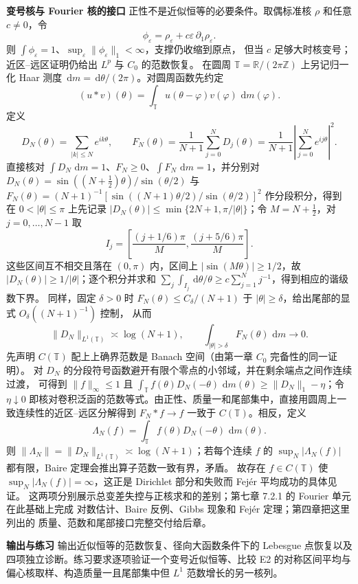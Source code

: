 \documentclass[11pt,a4paper]{ctexart}
\newcommand{\eps}{\varepsilon}
\newcommand{\dd}{\,\mathrm d}
\newcommand{\planitem}[1]{\par\smallskip\noindent\textcolor{deepblue}{\textbf{#1}}\quad}
\begin{document}
\planitem{变号核与 Fourier 核的接口}
正性不是近似恒等的必要条件。取偶标准核 $\rho$ 和任意 $c\ne0$，令
\[
 \phi_\eps=\rho_\eps+c\eps\,\partial_1\rho_\eps.
\]
则 $\int\phi_\eps=1$、$\sup_\eps\|\phi_\eps\|_1<\infty$，支撑仍收缩到原点，
但当 $c$ 足够大时核变号；近区--远区证明仍给出 $L^p$ 与 $C_0$ 的范数恢复。
在圆周 $\mathbb T=\mathbb R/(2\pi\mathbb Z)$ 上另记归一化 Haar 测度
$\dd m=\dd\theta/(2\pi)$。对圆周函数先约定
\[
(u*v)(\theta)=\int_{\mathbb T}u(\theta-\varphi)v(\varphi)\,\dd m(\varphi).
\]
定义
\[
 D_N(\theta)=\sum_{|k|\le N}e^{ik\theta},\qquad
 F_N(\theta)=\frac1{N+1}\sum_{j=0}^ND_j(\theta)
 =\frac1{N+1}\left|\sum_{j=0}^Ne^{ij\theta}\right|^2.
\]
直接核对 $\int D_N\,\dd m=1$、$F_N\ge0$、$\int F_N\,\dd m=1$，并分别对
$D_N(\theta)=\sin((N+\tfrac12)\theta)/\sin(\theta/2)$ 与
$F_N(\theta)=(N+1)^{-1}[\sin((N+1)\theta/2)/\sin(\theta/2)]^2$ 作分段积分，得到
在 $0<|\theta|\le\pi$ 上先记录
$|D_N(\theta)|\le\min\{2N+1,\pi/|\theta|\}$；令 $M=N+\tfrac12$，对
$j=0,\ldots,N-1$ 取
\[
 I_j=\left[\frac{(j+1/6)\pi}{M},\frac{(j+5/6)\pi}{M}\right].
\]
这些区间互不相交且落在 $(0,\pi)$ 内，区间上
$|\sin(M\theta)|\ge1/2$，故 $|D_N(\theta)|\ge1/|\theta|$；逐个积分并求和
$\sum_j\int_{I_j}\dd\theta/\theta\ge c\sum_{j=1}^{N}j^{-1}$，得到相应的谐级数下界。
同样，固定 $\delta>0$ 时
$F_N(\theta)\le C_\delta/(N+1)$ 于 $|\theta|\ge\delta$，给出尾部的显式 $O_\delta((N+1)^{-1})$ 控制，
从而
\[
 \|D_N\|_{L^1(\mathbb T)}\asymp\log(N+1),
 \qquad \int_{|\theta|>\delta}F_N(\theta)\,\dd m\longrightarrow0.
\]
先声明 $C(\mathbb T)$ 配上上确界范数是 Banach 空间（由第一章 $C_0$ 完备性的同一证明）。
对 $D_N$ 的分段符号函数避开有限个零点的小邻域，并在剩余端点之间作连续过渡，
可得到 $\|f\|_\infty\le1$ 且
$\int_{\mathbb T}f(\theta)D_N(-\theta)\,\dd m(\theta)\ge\|D_N\|_1-\eta$；令
$\eta\downarrow0$ 即核对卷积泛函的范数等式。由正性、质量一和尾部集中，直接用圆周上一致连续性的近区--远区分解得到
$F_N*f\to f$ 一致于 $C(\mathbb T)$。相反，定义
\[
 \Lambda_N(f)=\int_{\mathbb T}f(\theta)D_N(-\theta)\,\dd m(\theta).
\]
则 $\|\Lambda_N\|=\|D_N\|_{L^1(\mathbb T)}\asymp\log(N+1)$；若每个连续 $f$ 的
$\sup_N|\Lambda_N(f)|$ 都有限，Baire 定理会推出算子范数一致有界，矛盾。
故存在 $f\in C(\mathbb T)$ 使 $\sup_N|\Lambda_N(f)|=\infty$，这正是
Dirichlet 部分和失败而 Fej\'er 平均成功的具体见证。
这两项分别展示总变差失控与正核求和的差别；第七章 7.2.1 的 Fourier 单元在此基础上完成
对数估计、Baire 反例、Gibbs 现象和 Fejér 定理；第四章把这里列出的
质量、范数和尾部接口完整交付给后章。

\planitem{输出与练习}
输出近似恒等的范数恢复、径向大函数条件下的 Lebesgue 点恢复以及四项独立诊断。练习要求逐项验证一个变号近似恒等、比较 E2 的对称区间平均与偏心核取样、构造质量一且尾部集中但 $L^1$ 范数增长的另一核列。
\end{document}
